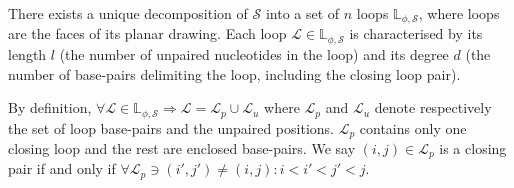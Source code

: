 \begin{mydef} \label{def:loops}

	There exists a unique decomposition of $\mathcal{S}$ into a set of $n$ loops $\mathbb{L}_{\phi, \mathcal{S}}$, where loops are the faces of its planar drawing. Each loop $\mathcal{L} \in \mathbb{L}_{\phi, \mathcal{S}}$ is characterised by its length $l$ (the number of unpaired nucleotides in the loop) and its degree $d$ (the number of base-pairs delimiting the loop, including the closing loop pair). 
	
	By definition, $\forall  \mathcal{L} \in \mathbb{L}_{\phi, \mathcal{S}} \Rightarrow \mathcal{L}  = \mathcal{L}_p \cup \mathcal{L}_u$ where $\mathcal{L}_p$ and $\mathcal{L}_u$ denote respectively the set of loop base-pairs and the unpaired positions. $\mathcal{L}_p$ contains only one closing loop and the rest are enclosed base-pairs. We say $(i,j) \in \mathcal{L}_p$ is a closing pair if and only if $\forall \mathcal{L}_p \ni (i',j') \neq (i,j) \colon i<i'<j'<j$.
	
	

\end{mydef}
